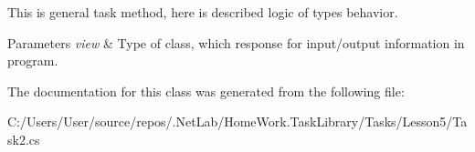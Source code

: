 This is general task method, here is described logic of types behavior. 


\begin{DoxyParams}{Parameters}
{\em view} & Type of class, which response for input/output information in program.\\
\hline
\end{DoxyParams}


The documentation for this class was generated from the following file\+:\begin{DoxyCompactItemize}
\item 
C\+:/\+Users/\+User/source/repos/.\+Net\+Lab/\+Home\+Work.\+Task\+Library/\+Tasks/\+Lesson5/Task2.\+cs\end{DoxyCompactItemize}
